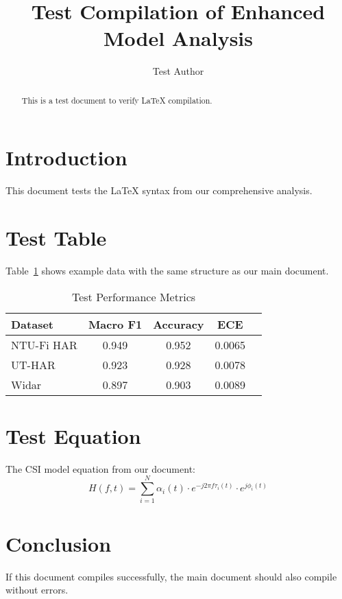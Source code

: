 \documentclass[journal]{IEEEtran}
\begin{document}
\title{Test Compilation of Enhanced Model Analysis}
\author{Test Author}

\maketitle

\begin{abstract}
This is a test document to verify LaTeX compilation.
\end{abstract}

\section{Introduction}
This document tests the LaTeX syntax from our comprehensive analysis.

\section{Test Table}
Table~\ref{tab:test} shows example data with the same structure as our main document.

\begin{table}[h]
\centering
\caption{Test Performance Metrics}
\label{tab:test}
\begin{tabular}{lcccc}
\toprule
\textbf{Dataset} & \textbf{Macro F1} & \textbf{Accuracy} & \textbf{ECE} \\
\midrule
NTU-Fi HAR & 0.949 & 0.952 & 0.0065 \\
UT-HAR & 0.923 & 0.928 & 0.0078 \\
Widar & 0.897 & 0.903 & 0.0089 \\
\bottomrule
\end{tabular}
\end{table}

\section{Test Equation}
The CSI model equation from our document:
\begin{equation}
H(f,t) = \sum_{i=1}^{N} \alpha_i(t) \cdot e^{-j2\pi f \tau_i(t)} \cdot e^{j\phi_i(t)}
\end{equation}

\section{Conclusion}
If this document compiles successfully, the main document should also compile without errors.
\end{document}
